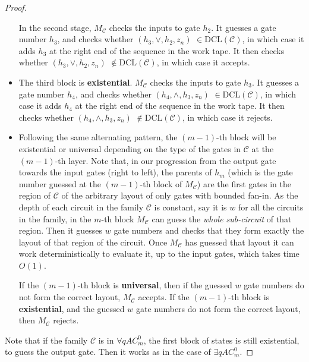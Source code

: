 \documentclass{article}
\begin{document}
\begin{proof}
\begin{itemize}
In the second stage, $M_{\mathcal{C}}$ checks the inputs to gate $h_{2}$. It guesses a gate number $h_{3}$, and checks whether $(h_{3}, \vee,  h_{2}, z_n)$ $\in \mathrm{DCL(\mathcal{C})}$, in which case it adds $h_{3}$ at the right end of the sequence in the work tape. It then checks whether $(h_{3}, \vee, h_{2},  z_n)$ $\not\in \mathrm{DCL(\mathcal{C})}$, in which case it accepts.

 \item
The third block is \textbf{existential}. $M_{\mathcal{C}}$ checks the inputs to gate $h_{3}$. It guesses a gate number $h_{4}$, and checks whether
$(h_{4}, \wedge, h_{3}, z_n)$ $\in \mathrm{DCL(\mathcal{C})}$, in which case it adds $h_{4}$ at the right end of the sequence in the work tape. It then checks whether
$(h_{4}, \wedge, h_{3}, z_n)$ $\not\in \mathrm{DCL(\mathcal{C})}$, in which case it rejects.


 \item
Following the same alternating pattern, the $(m-1)$-th block will be existential or universal depending on the type of the gates in $\mathcal{C}$ at the $(m- 1)$-th layer.
Note that, in our progression from the output gate towards the input gates (right to left), the parents of $h_{m}$ (which is the gate number guessed at the $(m-1)$-th block of $M_{\mathcal{C}}$) are the first gates in the region of $\mathcal{C}$ of the arbitrary layout of only gates with bounded fan-in. As the depth of each circuit in the family $\mathcal{C}$ is constant, say it is $w$ for all the circuits in the family, in the $m$-th block $M_{\mathcal{C}}$ can guess the \textit{whole sub-circuit} of that region. Then it guesses $w$ gate  numbers and checks that they form exactly the layout of that region of the circuit. Once  $M_{\mathcal{C}}$ has guessed that layout it can work deterministically to evaluate it, up to the input gates, which takes time $O(1)$.


If the $(m-1)$-th block is \textbf{universal}, then if the guessed $w$ gate numbers do not form the correct layout, $M_{\mathcal{C}}$ accepts.
If the $(m-1)$-th block is \textbf{existential}, and the guessed $w$ gate numbers do not form the correct layout, then $M_{\mathcal{C}}$ rejects.




\end{itemize}




Note that if the family $\mathcal{C}$ is in $\forall qAC^0_{m}$, the first block of states is still existential, to guess the output gate. Then it works as in the  case of $\exists qAC^0_{m}$. 
\end{proof}
\end{document}
